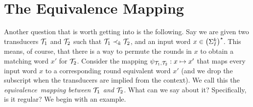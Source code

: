 \chapter{The Equivalence Mapping}
\label{chap:equiv_mapping}

Another question that is worth getting into is the following. Say we are given two transducers $\mathcal{T}_1$ and $\mathcal{T}_2$ such that $\mathcal{T}_1 \prec_{k} \mathcal{T}_2$, and an input word $x\in \left(\Sigma_{I}^k\right)^\star$. This means, of course, that there is a way to permute the rounds in $x$ to obtain a matching word $x'$ for $\mathcal{T}_2$.
Consider the mapping $\psi_{\mathcal{T}_1,\mathcal{T}_2}: x\mapsto x'$ that maps every input word $x$ to a corresponding round equivalent word $x'$ (and we drop the subscript when the transducers are implied from the context). We call this the \emph{equivalence~mapping between $\mathcal{T}_1$ and $\mathcal{T}_2$}. What can we say about it? Specifically, is it regular? We begin with an example.

